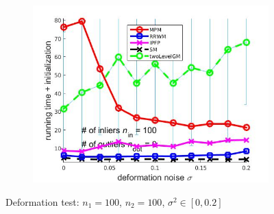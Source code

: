 \documentclass[
	fontsize=12pt,
	paper=a4,
	twoside=false,
	numbers=noenddot,
	plainheadsepline,
	toc=listof,
	toc=bibliography
]{scrartcl}
\begin{document}
\begin{figure}[h]
\begin{subfigure}[b]{0.3\textwidth}
	\end{subfigure} 
	\begin{subfigure}[b]{0.3\textwidth}
		\centering
		\includegraphics[scale=0.25]{"fig_ver2608/syntheticPointSets/ver4.2/deformation_test/time_summary_avg10t"} 
	\end{subfigure} 	
	\caption{Deformation test: $n_1=100$, $n_2=100$, $\sigma^2\in[0, 0.2]$}
	\label{fig:test1_ver42}
\end{figure}

\FloatBarrier	
\end{document}
